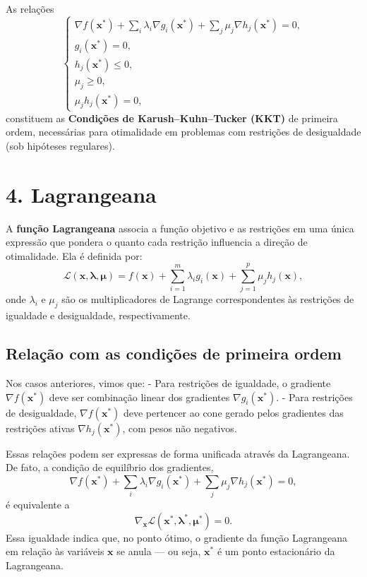 \documentclass[9pt,a4paper]{extarticle}
\begin{document}
As relações
\[
\begin{cases}
\nabla f(\bm{x}^*) + \sum_i \lambda_i \nabla g_i(\bm{x}^*) + \sum_j \mu_j \nabla h_j(\bm{x}^*) = 0,\\[4pt]
g_i(\bm{x}^*) = 0, \\[2pt]
h_j(\bm{x}^*) \le 0, \\[2pt]
\mu_j \ge 0, \\[2pt]
\mu_j h_j(\bm{x}^*) = 0,
\end{cases}
\]
constituem as \textbf{Condições de Karush–Kuhn–Tucker (KKT)} de primeira ordem, necessárias para otimalidade em problemas com restrições de desigualdade (sob hipóteses regulares).


\vspace{1em}

\section*{4. Lagrangeana}

A \textbf{função Lagrangeana} associa a função objetivo e as restrições em uma única expressão que pondera o quanto cada restrição influencia a direção de otimalidade.  
Ela é definida por:
\[
\mathcal{L}(\bm{x}, \bm{\lambda}, \bm{\mu}) 
= f(\bm{x}) 
+ \sum_{i=1}^{m} \lambda_i g_i(\bm{x}) 
+ \sum_{j=1}^{p} \mu_j h_j(\bm{x}),
\]
onde $\lambda_i$ e $\mu_j$ são os multiplicadores de Lagrange correspondentes às restrições de igualdade e desigualdade, respectivamente.

\subsection*{Relação com as condições de primeira ordem}

Nos casos anteriores, vimos que:
- Para restrições de igualdade, o gradiente $\nabla f(\bm{x}^*)$ deve ser combinação linear dos gradientes $\nabla g_i(\bm{x}^*)$.
- Para restrições de desigualdade, $\nabla f(\bm{x}^*)$ deve pertencer ao cone gerado pelos gradientes das restrições ativas $\nabla h_j(\bm{x}^*)$, com pesos não negativos.

Essas relações podem ser expressas de forma unificada através da Lagrangeana.  
De fato, a condição de equilíbrio dos gradientes,
\[
\nabla f(\bm{x}^*) 
+ \sum_i \lambda_i \nabla g_i(\bm{x}^*) 
+ \sum_j \mu_j \nabla h_j(\bm{x}^*) = 0,
\]
é equivalente a
\[
\nabla_{\bm{x}} \mathcal{L}(\bm{x}^*, \bm{\lambda}^*, \bm{\mu}^*) = 0.
\]
Essa igualdade indica que, no ponto ótimo, o gradiente da função Lagrangeana em relação às variáveis $\bm{x}$ se anula — ou seja, $\bm{x}^*$ é um ponto estacionário da Lagrangeana.
\end{document}
